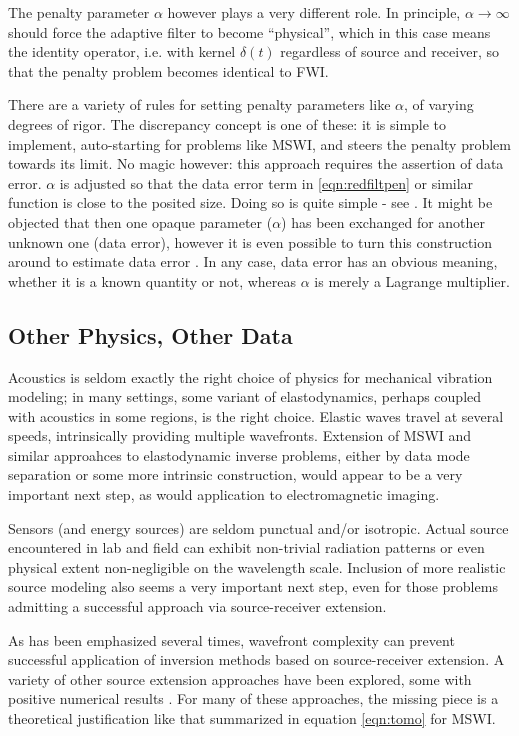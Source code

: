 The penalty parameter $\alpha$ however plays a very different role. In
principle, $\alpha \rightarrow \infty$ should force the adaptive
filter to become ``physical'', which in this case means the identity
operator, i.e. with kernel $\delta(t)$ regardless of source and
receiver, so that the penalty problem becomes identical to FWI.

There are a variety of rules for setting penalty parameters like
$\alpha$, of varying degrees of rigor. The discrepancy concept is one
of these: it is simple to implement, auto-starting for problems like
MSWI, and steers the penalty problem towards its limit. No magic
however: this approach requires the assertion of data error. $\alpha$
is adjusted so that the data error term in \ref{eqn:redfiltpen} or
similar function is close to the posited size. Doing so is quite
simple - see \cite{Fu:Geo17b,SymesMinkoffChen:IP22}. It might be objected that
then one opaque parameter ($\alpha$) has been exchanged for another
unknown one (data error), however it is even possible to turn this
construction around to estimate data error
\cite[]{ChenSymesMinkoff:IMAGE22}. In any case, data error has an
obvious meaning, whether it is a known quantity or not, whereas
$\alpha$ is merely a Lagrange multiplier.

\subsection{Other Physics, Other Data}
Acoustics is seldom exactly the right choice of physics for mechanical
vibration modeling; in many settings, some variant of elastodynamics,
perhaps coupled with acoustics in some regions, is the right
choice. Elastic waves travel at several speeds, intrinsically
providing multiple wavefronts. Extension of MSWI and similar
approahces to elastodynamic inverse problems, either by data mode
separation or some more intrinsic construction, would appear to be a
very important next step, as would application to electromagnetic imaging.

Sensors (and energy sources) are seldom punctual and/or
isotropic. Actual source encountered in lab and field can exhibit
non-trivial radiation patterns or even physical extent non-negligible
on the wavelength scale. Inclusion of more realistic source modeling
also seems a very important next step, even for those problems
admitting a successful approach via source-receiver extension.

As has been emphasized several times, wavefront complexity can prevent
successful application of inversion methods based on source-receiver
extension. A variety of other source extension approaches have been
explored, some with positive numerical results
\cite[]{HuangNammourSymesDollizal:SEG19}. For many of these
approaches, the missing piece is a theoretical justification like that
summarized in equation \ref{eqn:tomo} for MSWI.

